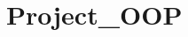 \chapter{Project\+\_\+\+OOP }
\hypertarget{md__r_e_a_d_m_e}{}\label{md__r_e_a_d_m_e}
\label{md__r_e_a_d_m_e_autotoc_md0}%
%

